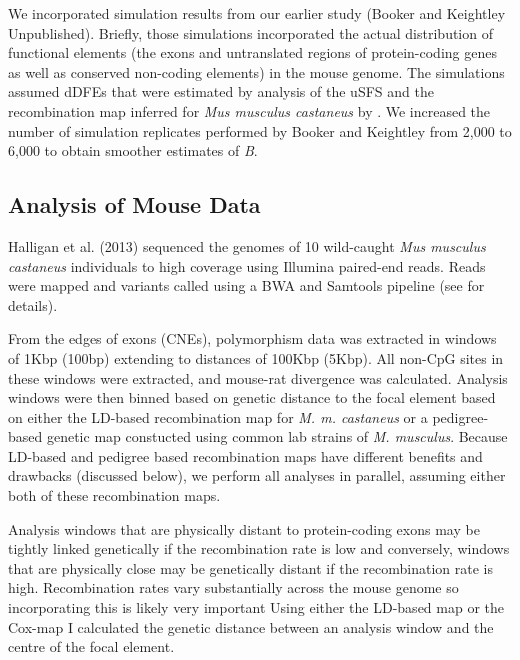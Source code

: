 \documentclass[11pt]{article}
\begin{document}
 	We incorporated simulation results from our earlier study (Booker and Keightley Unpublished). Briefly, those simulations incorporated the actual distribution of functional elements (the exons and untranslated regions of protein-coding genes as well as conserved non-coding elements)  in the mouse genome. The simulations assumed dDFEs that were estimated by analysis of the uSFS and the recombination map inferred for \textit{Mus musculus castaneus} by \cite{RN340}. We increased the number of simulation replicates performed by Booker and Keightley from 2,000 to 6,000 to obtain smoother estimates of \textit{B}.


	\subsection*{Analysis of Mouse Data}

Halligan et al. (2013) sequenced the genomes of 10 wild-caught \emph{Mus musculus castaneus} individuals to high coverage using Illumina paired-end reads. Reads were mapped and variants called using a BWA and Samtools pipeline (see \citealt{RN122} for details). 

	From the edges of exons (CNEs), polymorphism data was extracted in windows of 1Kbp (100bp) extending to distances of 100Kbp (5Kbp). All non-CpG sites in these windows were extracted, and mouse-rat divergence was calculated. Analysis windows were then binned based on genetic distance to the focal element based on either the LD-based recombination map for \textit{M. m. castaneus} \citep{RN340} or a pedigree-based genetic map constucted using common lab strains of \textit{M. musculus}. Because LD-based and pedigree based recombination maps have different benefits and drawbacks (discussed below), we perform all analyses in parallel, assuming either both of these recombination maps.
	
	Analysis windows that are physically distant to protein-coding exons may be tightly linked genetically if the recombination rate is low and conversely, windows that are physically close may be genetically distant if the recombination rate is high. Recombination rates vary substantially across the mouse genome so incorporating this is likely very important 
	Using either the LD-based map or the Cox-map I calculated the genetic distance between an analysis window and the centre of the focal element. 
\end{document}
